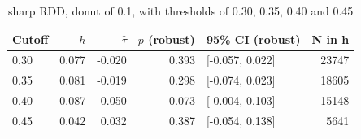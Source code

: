 \begin{table}[htbp]
\centering
\caption{sharp RDD, donut of 0.1, with thresholds of 0.30, 0.35, 0.40 and 0.45}
\label{tab:placebo-rdd}
\begin{tabular}{lrrrlr}
\toprule
Cutoff & $h$ & $\hat\tau$ & $p$ (robust) & 95\% CI (robust) & N in h \\
\midrule
0.30 & 0.077 & -0.020 & 0.393 & [-0.057, 0.022] & 23747 \\
0.35 & 0.081 & -0.019 & 0.298 & [-0.074, 0.023] & 18605 \\
0.40 & 0.087 & 0.050 & 0.073 & [-0.004, 0.103] & 15148 \\
0.45 & 0.042 & 0.032 & 0.387 & [-0.054, 0.138] & 5641 \\
\bottomrule
\end{tabular}
\end{table}
